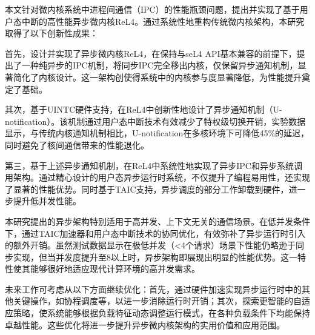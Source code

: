 

\begin{conclusion}

本文针对微内核系统中进程间通信（IPC）的性能瓶颈问题，提出并实现了基于用户态中断的高性能异步微内核ReL4。通过系统性地重构传统微内核架构，本研究取得了以下创新性成果：

首先，设计并实现了异步微内核ReL4，在保持与seL4 API基本兼容的前提下，提出了一种纯异步的IPC机制，将同步IPC完全移出内核，仅保留异步通知机制，显著简化了内核设计。这一架构创使得系统中的内核参与度显著降低，为性能提升奠定了基础。
    
其次，基于UINTC硬件支持，在ReL4中创新性地设计了异步通知机制（U-notification）。该机制通过用户态中断技术有效减少了特权级切换开销，实验数据显示，与传统内核通知机制相比，U-notification在多核环境下可降低45\%的延迟，同时避免了核间通信带来的性能退化。
    
第三，基于上述异步通知机制，在ReL4中系统性地实现了异步IPC和异步系统调用架构。通过精心设计的用户态异步运行时系统，不仅提升了编程易用性，还实现了显著的性能优势。同时基于TAIC支持，异步调度的部分工作卸载到硬件，进一步提升低并发性能。
    
本研究提出的异步架构特别适用于高并发、上下文无关的通信场景。在低并发条件下，通过TAIC加速器和用户态中断技术的协同优化，有效弥补了异步运行时引入的额外开销。虽然测试数据显示在极低并发（<4个请求）场景下性能仍略逊于同步实现，但当并发度提升至8以上时，异步架构即展现出明显的性能优势。这一特性使其能够很好地适应现代计算环境的高并发需求。
    
未来工作可考虑从以下方面继续优化：首先，通过硬件加速实现异步运行时中的其他关键操作，如协程调度等，以进一步消除运行时开销；其次，探索更智能的自适应策略，使系统能够根据负载特征动态调整运行模式，在各种负载条件下均能保持卓越性能。这些优化将进一步提升异步微内核架构的实用价值和应用范围。
    

\end{conclusion}